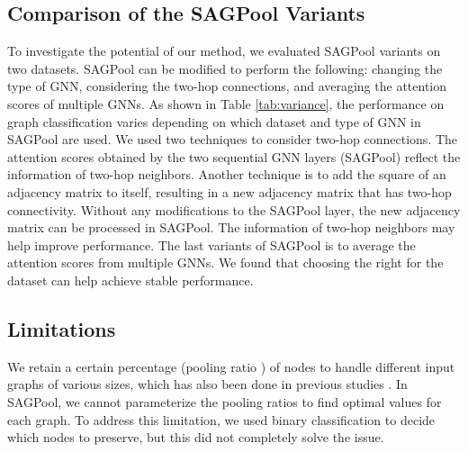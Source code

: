 \documentclass{article}
\begin{document}
\subsection{Comparison of the SAGPool Variants}
\label{analysis:variants}
To investigate the potential of our method, we evaluated SAGPool variants on two datasets. SAGPool can be modified to perform the following: changing the type of GNN, considering the two-hop connections, and averaging the attention scores of multiple GNNs. As shown in Table \ref{tab:variance}, the performance on graph classification varies depending on which dataset and type of GNN in SAGPool are used.
We used two techniques to consider two-hop connections. The attention scores obtained by the two sequential GNN layers (SAGPool) reflect the information of two-hop neighbors. 
Another technique is to add the square of an adjacency matrix to itself, resulting in a new adjacency matrix that has two-hop connectivity. Without any modifications to the SAGPool layer, the new adjacency matrix can be processed in SAGPool. The information of two-hop neighbors may help improve performance.
The last variants of SAGPool is to average the attention scores from multiple GNNs. We found that choosing the right  for the dataset can help achieve stable performance.


\subsection{Limitations}
\label{analysis:limit}
We retain a certain percentage (pooling ratio ) of nodes to handle different input graphs of various sizes, which has also been done in previous studies \cite{gao2019graph,cangea2018towards}. 
In SAGPool, we cannot parameterize the pooling ratios to find optimal values for each graph. To address this limitation, we used binary classification to decide which nodes to preserve, but this did not completely solve the issue.
 
\end{document}
